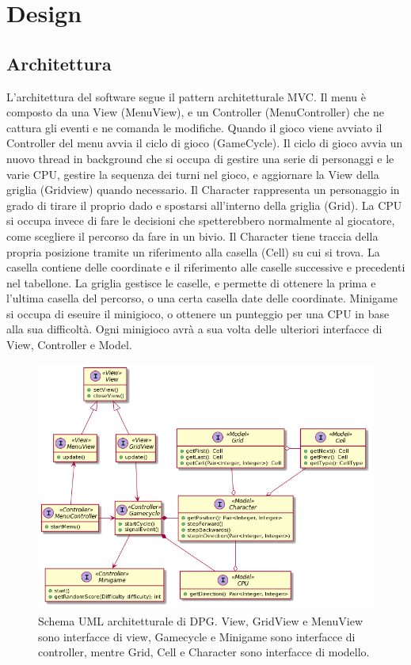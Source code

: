\documentclass[a4paper,12pt]{report}
\begin{document}
	\chapter{Design}

	\section{Architettura}

	L'architettura del software segue il pattern architetturale MVC.
	Il menu è composto da una View (MenuView), e un Controller (MenuController) che ne cattura gli eventi e ne comanda le modifiche.
	Quando il gioco viene avviato il Controller del menu avvia il ciclo di gioco (GameCycle).
	Il ciclo di gioco avvia un nuovo thread in background che si occupa di gestire una serie di personaggi e le varie CPU, gestire la sequenza dei turni nel gioco, e aggiornare la View della griglia (Gridview) quando necessario.
	Il Character rappresenta un personaggio in grado di tirare il proprio dado e spostarsi all'interno della griglia (Grid).
	La CPU si occupa invece di fare le decisioni che spetterebbero normalmente al giocatore, come scegliere il percorso da fare in un bivio.
	Il Character tiene traccia della propria posizione tramite un riferimento alla casella (Cell) su cui si trova.
	La casella contiene delle coordinate e il riferimento alle caselle successive e precedenti nel tabellone.
	La griglia gestisce le caselle, e permette di ottenere la prima e l'ultima casella del percorso, o una certa casella date delle coordinate.
	Minigame si occupa di eseuire il minigioco, o ottenere un punteggio per una CPU in base alla sua difficoltà.
	Ogni minigioco avrà a sua volta delle ulteriori interfacce di View, Controller e Model.

	\begin{figure}[!t]
		\centering{}
		\includegraphics[width=\textwidth]{images/arch.png}
		\caption{Schema UML architetturale di DPG. View, GridView e MenuView sono interfacce di view, Gamecycle e Minigame sono interfacce di controller, mentre Grid, Cell e Character sono interfacce di modello.}
		\label{img:goodarch}
	\end{figure}
\end{document}
